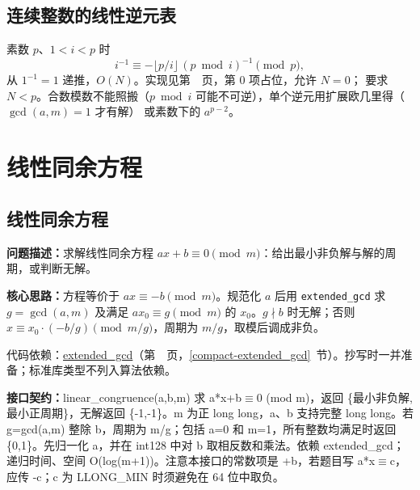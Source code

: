 \subsection{连续整数的线性逆元表}\label{knowledge-linear-inverses}
素数 $p$、$1<i<p$ 时
\[
i^{-1}\equiv-\lfloor p/i\rfloor\,(p\bmod i)^{-1}\pmod p,
\]
从 $1^{-1}=1$ 递推，$O(N)$。实现见第~\pageref{compact-inverse_table}~页，第 0 项占位，允许 $N=0$；
要求 $N<p$。合数模数不能照搬（$p\bmod i$ 可能不可逆），单个逆元用扩展欧几里得（$\gcd(a,m)=1$ 才有解）
或素数下的 $a^{p-2}$。



\newpage

\Needspace{388pt}

\section{线性同余方程}

\subsection{线性同余方程}\label{compact-linear_congruence}

\noindent\textbf{问题描述：}\allowbreak 求解线性同余方程 $ax+b\equiv0\pmod m$：给出最小非负解与解的周期，或判断无解。

\textbf{核心思路：}\allowbreak 方程等价于 $ax\equiv-b\pmod m$。规范化 $a$ 后用 \texttt{extended\_gcd} 求 $g=\gcd(a,m)$ 及满足 $ax_0\equiv g\pmod m$ 的 $x_0$。$g\nmid b$ 时无解；否则 $x\equiv x_0\cdot(-b/g)\pmod{m/g}$，周期为 $m/g$，取模后调成非负。

代码依赖：\hyperref[compact-extended_gcd]{extended\_\allowbreak{}gcd}（第~\pageref{compact-extended_gcd}~页，\ref{compact-extended_gcd}~节）。抄写时一并准备；标准库类型不列入算法依赖。

{\sloppy{}\noindent\textbf{接口契约：}linear\_congruence(a,b,m) 求 a*x+b$\equiv$0 (mod m)，返回 \{最小非负解,最小正周期\}，无解返回 \{-1,-1\}。m 为正 long long，a、b 支持完整 long long。若 g=gcd(a,m) 整除 b，周期为 m/g；包括 a=0 和 m=1，所有整数均满足时返回 \{0,1\}。先归一化 a，并在 int128 中对 b 取相反数和乘法。依赖 extended\_gcd；递归时间、空间 O(log(m+1))。注意本接口的常数项是 +b，若题目写 a*x$\equiv$c，应传 -c；c 为 LLONG\_MIN 时须避免在 64 位中取负。\par}



